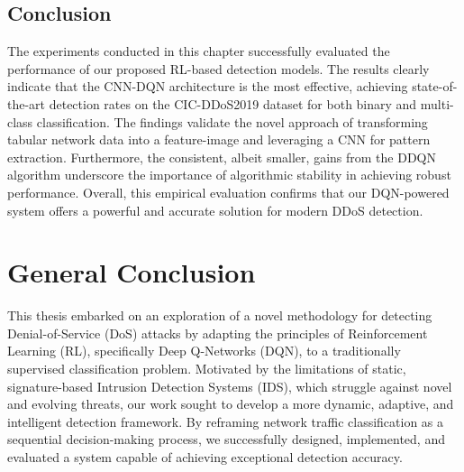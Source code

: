 \documentclass[16pt]{report}
\begin{document}
\section{Conclusion}
The experiments conducted in this chapter successfully evaluated the performance of our proposed RL-based detection models. The results clearly indicate that the CNN-DQN architecture is the most effective, achieving state-of-the-art detection rates on the CIC-DDoS2019 dataset for both binary and multi-class classification. The findings validate the novel approach of transforming tabular network data into a feature-image and leveraging a CNN for pattern extraction. Furthermore, the consistent, albeit smaller, gains from the DDQN algorithm underscore the importance of algorithmic stability in achieving robust performance. Overall, this empirical evaluation confirms that our DQN-powered system offers a powerful and accurate solution for modern DDoS detection.

\chapter*{General Conclusion}

This thesis embarked on an exploration of a novel methodology for detecting Denial-of-Service (DoS) attacks by adapting the principles of Reinforcement Learning (RL), specifically Deep Q-Networks (DQN), to a traditionally supervised classification problem. Motivated by the limitations of static, signature-based Intrusion Detection Systems (IDS), which struggle against novel and evolving threats, our work sought to develop a more dynamic, adaptive, and intelligent detection framework. By reframing network traffic classification as a sequential decision-making process, we successfully designed, implemented, and evaluated a system capable of achieving exceptional detection accuracy.
\end{document}

